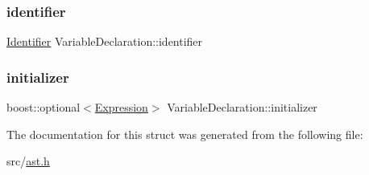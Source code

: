 \subsubsection{\texorpdfstring{identifier}{identifier}}
{\footnotesize\ttfamily \hyperlink{struct_identifier}{Identifier} Variable\+Declaration\+::identifier}

\mbox{\label{struct_variable_declaration_a8e4857906d3af342fa2fb5675ff9a410}} 
\subsubsection{\texorpdfstring{initializer}{initializer}}
{\footnotesize\ttfamily boost\+::optional$<$\hyperlink{ast_8h_a4cb273a4d960cd13ea17d08f254493e8}{Expression}$>$ Variable\+Declaration\+::initializer}



The documentation for this struct was generated from the following file\+:\begin{DoxyCompactItemize}
\item 
src/\hyperlink{ast_8h}{ast.\+h}\end{DoxyCompactItemize}
